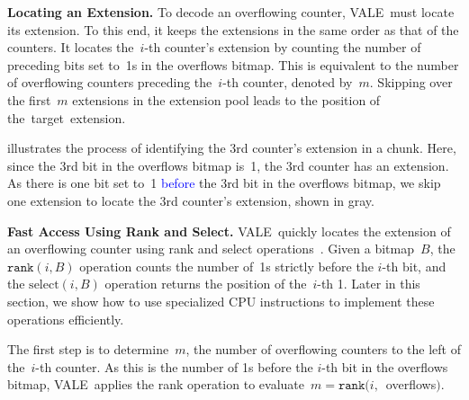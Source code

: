 \documentclass[sigconf]{acmart}
\newcommand{\counterencodingabbrv}{VALE}
\begin{document}
\textbf{Locating an Extension.}
To decode an overflowing counter, \counterencodingabbrv\ must locate its
extension. To this end, it keeps the extensions in the same order as that of
the counters. It locates the~$i${\nobreakdash-}th counter's extension by
counting the number of preceding bits set to~1s in the overflows bitmap. This
is equivalent to the number of overflowing counters preceding
the~$i${\nobreakdash-}th counter, denoted by~$m$. Skipping over the first~$m$
extensions in the extension pool leads to the position of the~target~extension.

 illustrates the process of identifying
the 3rd counter's extension in a chunk. Here, since the 3rd bit in the
overflows bitmap is~1, the 3rd counter has an extension. As there is one bit
set to~1 \textcolor{blue}{before} the 3rd bit in the overflows bitmap, we skip
one extension to locate the 3rd counter's extension, shown in gray.

\textbf{Fast Access Using Rank and Select.}
\counterencodingabbrv\ quickly locates the extension of an overflowing counter
using rank and select
operations~\cite{Poppy,FlorianRankandSelect,CompactPATTrees,RankandSelectDict,GQF}.
Given a bitmap~$B$, the $\texttt{rank}(i,B)$ operation counts the number of~1s
strictly before the $i$-th bit, and the $\text{select}(i,B)$ operation returns
the position of the~$i${\nobreakdash-}th 1. Later in this section, we show how
to use specialized CPU instructions to implement these operations efficiently. 

The first step is to determine~$m$, the number of overflowing counters to the
left of the~$i${\nobreakdash-}th counter. As this is the number of 1s before
the $i${\nobreakdash-}th bit in the overflows bitmap, \counterencodingabbrv\
applies the rank operation to evaluate~$m=\texttt{rank}(i,$~overflows$)$.
\end{document}
